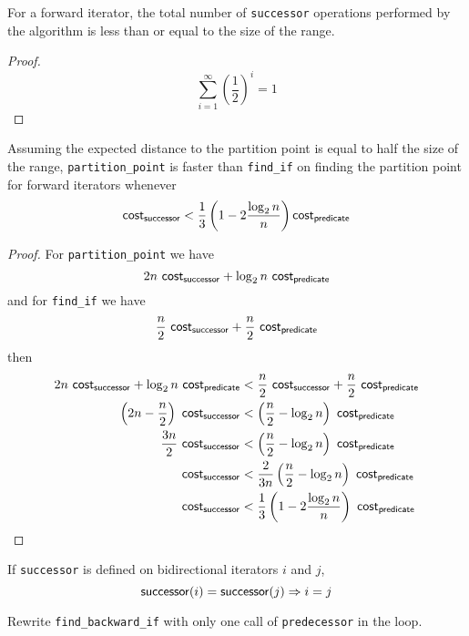 

\begin{lemma}
	For a forward iterator, the total number of \verb|successor| operations
	performed by the algorithm is less than or equal to the size of the range.
\end{lemma}

\begin{proof}
	\[ \sum_{i=1}^{\infty}{\left ( \frac{1}{2} \right )^i} = 1 \]
\end{proof}

\begin{lemma}
	Assuming the expected distance to the partition point is equal to half the
	size of the range, \verb|partition_point| is faster than \verb|find_if| on
	finding the partition point for forward iterators whenever
	\[ \mathsf{cost}_{\mathsf{successor}} < \frac{1}{3} \left(1 - 2\frac{\log_2n}{n}\right) \mathsf{cost}_{\mathsf{predicate}} \]
\end{lemma}

\begin{proof}
	For \verb|partition_point| we have
	\[ 2n\ \func{cost}_{\func{successor}} + \log_2{n}\ \func{cost}_{\func{predicate}} \]
	and for \verb|find_if| we have
	\[ \frac{n}{2}\ \func{cost}_{\func{successor}} + \frac{n}{2}\ \func{cost}_{\func{predicate}} \]
	then
	\begin{align*}
		2n\ \func{cost}_{\func{successor}} + \log_2{n}\ \func{cost}_{\func{predicate}}
		&< \frac{n}{2}\ \func{cost}_{\func{successor}} + \frac{n}{2}\ \func{cost}_{\func{predicate}}\\
		\left(2n - \frac{n}{2}\right)\ \func{cost}_{\func{successor}}
		&< \left(\frac{n}{2} - \log_2n\right)\ \func{cost}_{\func{predicate}}\\
		\frac{3n}{2}\ \func{cost}_{\func{successor}}
		&< \left(\frac{n}{2} - \log_2n\right)\ \func{cost}_{\func{predicate}}\\
		\func{cost}_{\func{successor}}
		&< \frac{2}{3n}\left(\frac{n}{2} - \log_2n\right)\ \func{cost}_{\func{predicate}}\\
		\func{cost}_{\func{successor}}
		&< \frac{1}{3}\left(1 - 2\frac{\log_2n}{n}\right)\ \func{cost}_{\func{predicate}}
	\end{align*}
\end{proof}

\begin{lemma}
	If \verb|successor| is defined on bidirectional iterators $i$ and $j$,
	\[ \mathsf{successor}(i) = \mathsf{successor}(j) \Rightarrow i = j \]
\end{lemma}

\begin{exercise}
	Rewrite \verb|find_backward_if| with only one call of \verb|predecessor| in the loop.
\end{exercise}
